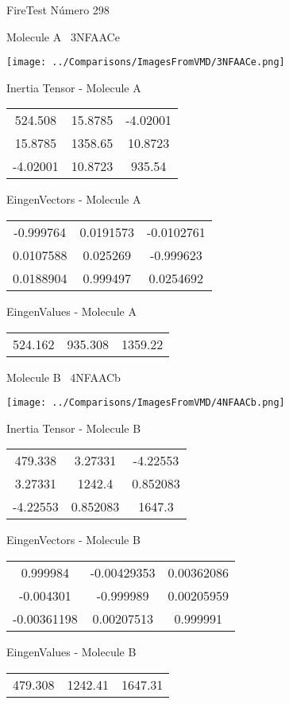 \vtab[-3cm]
\begin{center}
{\large FireTest \tab Número 298}
\end{center}
\begin{multicols}{2}
\begin{center}

Molecule A \
3NFAACe

\texttt{[image: ../Comparisons/ImagesFromVMD/3NFAACe.png]}

Inertia Tensor - Molecule A \\
\begin{tabular}{|c c c|}
524.508	 & 	15.8785	 & 	-4.02001	 \\
15.8785	 & 	1358.65	 & 	10.8723	 \\
-4.02001	 & 	10.8723	 & 	935.54
\end{tabular}

\vtab
 EingenVectors - Molecule A     \\
\begin{tabular}{|c c c|}
-0.999764	 & 	0.0191573	 & 	-0.0102761	 \\
0.0107588	 & 	0.025269	 & 	-0.999623	 \\
0.0188904	 & 	0.999497	 & 	0.0254692
\end{tabular}

\vtab
 EingenValues - Molecule A     \\
\begin{tabular}{|c c c|}
524.162	 & 	935.308	 & 	1359.22	 \\
\end{tabular}
\columnbreak

Molecule B \
4NFAACb

\texttt{[image: ../Comparisons/ImagesFromVMD/4NFAACb.png]}

Inertia Tensor - Molecule B \\
\begin{tabular}{|c c c|}
479.338	 & 	3.27331	 & 	-4.22553	 \\
3.27331	 & 	1242.4	 & 	0.852083	 \\
-4.22553	 & 	0.852083	 & 	1647.3
\end{tabular}

\vtab
 EingenVectors - Molecule B     \\
\begin{tabular}{|c c c|}
0.999984	 & 	-0.00429353	 & 	0.00362086	 \\
-0.004301	 & 	-0.999989	 & 	0.00205959	 \\
-0.00361198	 & 	0.00207513	 & 	0.999991
\end{tabular}

\vtab
 EingenValues - Molecule B     \\
\begin{tabular}{|c c c|}
479.308	 & 	1242.41	 & 	1647.31	 \\
\end{tabular}

\end{center}
\end{multicols}

